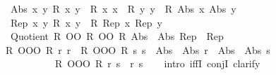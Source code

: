 \begin{isabellebody}
\ \ \ Abs{}{\isacharcolon}{\kern0pt}\ {\isachardoublequoteopen}{\isasymAnd}x\ y{\isachardot}{\kern0pt}\ R{}{\isacharprime}{\kern0pt}\ x\ y\ {\isasymLongrightarrow}\ R{}\ x\ x\ {\isasymLongrightarrow}\ R{}\ y\ y\ {\isasymLongrightarrow}\ R{}\ {\isacharparenleft}{\kern0pt}Abs{}\ x{\isacharparenright}{\kern0pt}\ {\isacharparenleft}{\kern0pt}Abs{}\ y{\isacharparenright}{\kern0pt}{\isachardoublequoteclose}\isanewline
\ \ \ Rep{}{\isacharcolon}{\kern0pt}\ {\isachardoublequoteopen}{\isasymAnd}x\ y{\isachardot}{\kern0pt}\ R{}\ x\ y\ {\isasymLongrightarrow}\ R{}{\isacharprime}{\kern0pt}\ {\isacharparenleft}{\kern0pt}Rep{}\ x{\isacharparenright}{\kern0pt}\ {\isacharparenleft}{\kern0pt}Rep{}\ y{\isacharparenright}{\kern0pt}{\isachardoublequoteclose}\isanewline
\ \ \ {\isachardoublequoteopen}Quotient{}\ {\isacharparenleft}{\kern0pt}R{}\ OO\ R{}{\isacharprime}{\kern0pt}\ OO\ R{}{\isacharparenright}{\kern0pt}\ {\isacharparenleft}{\kern0pt}Abs{}\ {\isasymcirc}\ Abs{}{\isacharparenright}{\kern0pt}\ {\isacharparenleft}{\kern0pt}Rep{}\ {\isasymcirc}\ Rep{}{\isacharparenright}{\kern0pt}{\isachardoublequoteclose}\isanewline
%
\isadelimproof
%
\endisadelimproof
%
\isatagproof
{}\isamarkupfalse%
\ {\isacharminus}{\kern0pt}\isanewline
\ \ \isamarkupfalse%
\ {\isacharasterisk}{\kern0pt}{\isacharcolon}{\kern0pt}\ {\isachardoublequoteopen}{\isacharparenleft}{\kern0pt}R{}\ OOO\ R{}{\isacharprime}{\kern0pt}{\isacharparenright}{\kern0pt}\ r\ r\ {\isasymand}\ {\isacharparenleft}{\kern0pt}R{}\ OOO\ R{}{\isacharprime}{\kern0pt}{\isacharparenright}{\kern0pt}\ s\ s\ {\isasymand}\ {\isacharparenleft}{\kern0pt}Abs{}\ {\isasymcirc}\ Abs{}{\isacharparenright}{\kern0pt}\ r\ {\isacharequal}{\kern0pt}\ {\isacharparenleft}{\kern0pt}Abs{}\ {\isasymcirc}\ Abs{}{\isacharparenright}{\kern0pt}\ s\isanewline
\ \ \ \ \ \ \ \ \ \ \ {\isasymlongleftrightarrow}\ {\isacharparenleft}{\kern0pt}R{}\ OOO\ R{}{\isacharprime}{\kern0pt}{\isacharparenright}{\kern0pt}\ r\ s{\isachardoublequoteclose}\ \ r\ s\isanewline
\ \ \isamarkupfalse%
\ {\isacharparenleft}{\kern0pt}intro\ iffI\ conjI{\isacharsemicolon}{\kern0pt}\ clarify{\isacharparenright}{\kern0pt}\ \isanewline

\end{isabellebody}
